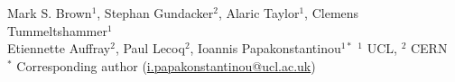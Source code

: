 Mark S. Brown${}^1$, Stephan Gundacker${}^2$, Alaric Taylor${}^1$, Clemens Tummeltshammer${}^1$\\ 
Etiennette Auffray${}^2$, Paul Lecoq${}^2$, Ioannis Papakonstantinou${}^{1*}$
${}^1$ UCL, ${}^2$ CERN\\
${}^*$ Corresponding author (\href{i.papakonstantinou@ucl.ac.uk}{i.papakonstantinou@ucl.ac.uk})

